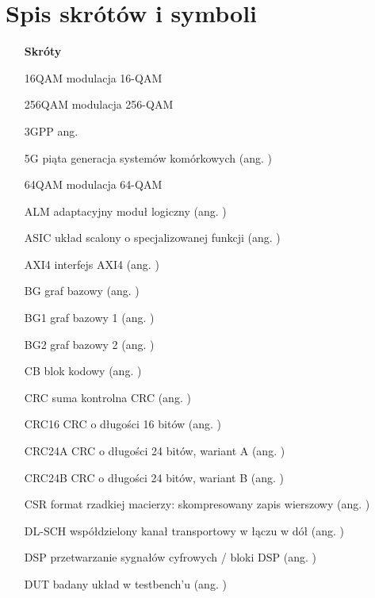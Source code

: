 \chapter{Spis skrótów i symboli}

\begin{itemize}

\item[] \textbf{Skróty}

\item[16QAM] modulacja 16-QAM
\item[256QAM] modulacja 256-QAM
\item[3GPP] ang. 
\item[5G] piąta generacja systemów komórkowych (ang. )
\item[64QAM] modulacja 64-QAM
\item[ALM] adaptacyjny moduł logiczny (ang. )
\item[ASIC] układ scalony o specjalizowanej funkcji (ang. )
\item[AXI4] interfejs AXI4 (ang. )

\item[BG] graf bazowy (ang. )
\item[BG1] graf bazowy 1 (ang. )
\item[BG2] graf bazowy 2 (ang. )

\item[CB] blok kodowy (ang. )
\item[CRC] suma kontrolna CRC (ang. )
\item[CRC16] CRC o długości 16 bitów (ang. )
\item[CRC24A] CRC o długości 24 bitów, wariant A (ang. )
\item[CRC24B] CRC o długości 24 bitów, wariant B (ang. )
\item[CSR] format rzadkiej macierzy: skompresowany zapis wierszowy (ang. )

\item[DL-SCH] współdzielony kanał transportowy w łączu w dół (ang. )
\item[DSP] przetwarzanie sygnałów cyfrowych / bloki DSP (ang. )
\item[DUT] badany układ w {testbench'u} (ang. )


\end{itemize}
